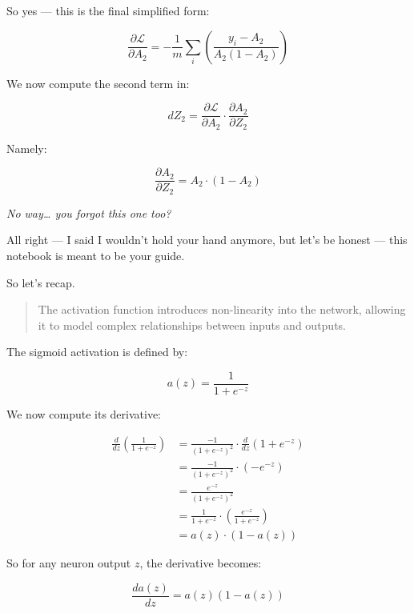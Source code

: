 \documentclass[11pt]{article}
\begin{document}
So yes — this is the final simplified form:

\[
\boxed{
\frac{\partial \mathcal{L}}{\partial A_2}
= -\frac{1}{m} \sum_i \left( \frac{y_i - A_2}{A_2(1 - A_2)} \right)
}
\]

\vspace{1em}

We now compute the second term in:

\[
dZ_2 = \frac{\partial \mathcal{L}}{\partial A_2} \cdot \frac{\partial A_2}{\partial Z_2}
\]

Namely:

\[
\frac{\partial A_2}{\partial Z_2} = A_2 \cdot (1 - A_2)
\]

\vspace{1em}

\textit{No way… you forgot this one too?}

\vspace{1em}

All right — I said I wouldn’t hold your hand anymore,  
but let’s be honest — this notebook is meant to be your guide.

So let’s recap.

\vspace{1em}

\begin{quote}
The activation function introduces non-linearity into the network,  
allowing it to model complex relationships between inputs and outputs.
\end{quote}

The sigmoid activation is defined by:

\[
a(z) = \frac{1}{1 + e^{-z}}
\]

We now compute its derivative:

\[
\begin{aligned}
\frac{d}{dz} \left( \frac{1}{1 + e^{-z}} \right)
&= \frac{-1}{(1 + e^{-z})^2} \cdot \frac{d}{dz}(1 + e^{-z}) \\
&= \frac{-1}{(1 + e^{-z})^2} \cdot (-e^{-z}) \\
&= \frac{e^{-z}}{(1 + e^{-z})^2} \\
&= \frac{1}{1 + e^{-z}} \cdot \left( \frac{e^{-z}}{1 + e^{-z}} \right) \\
&= a(z) \cdot (1 - a(z))
\end{aligned}
\]

So for any neuron output \( z \), the derivative becomes:

\[
\boxed{
\frac{da(z)}{dz} = a(z)(1 - a(z))
}
\]
\end{document}
